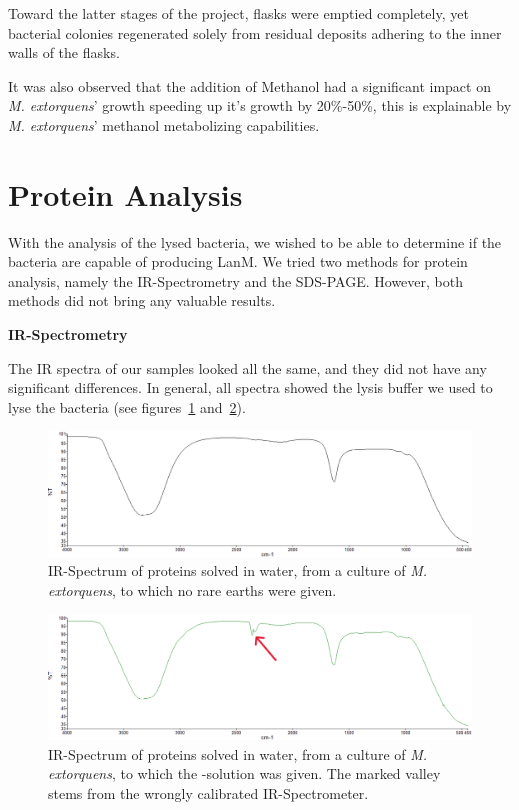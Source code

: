 Toward the latter stages of the project, flasks were emptied completely, yet bacterial colonies
regenerated solely from residual deposits adhering to the inner walls of the flasks.

It was also observed that the addition of Methanol had a significant impact on \emph{M. extorquens}’
growth speeding up it’s growth by 20\%-50\%, this is explainable by \emph{M. extorquens}’ methanol
metabolizing capabilities.

\section{Protein Analysis\authorA}

With the analysis of the lysed bacteria, we wished to be able to determine if the bacteria are capable of producing LanM.
We tried two methods for protein analysis, namely the IR-Spectrometry and the SDS-PAGE.
However, both methods did not bring any valuable results.

\textbf{IR-Spectrometry}

The IR spectra of our samples looked all the same, and they did not have any significant differences.
In general, all spectra showed the lysis buffer we used to lyse the bacteria (see figures~\ref{fig:ir_spectrum_2} and~\ref{fig:ir_spectrum_1}).

\begin{figure}[H]
    \centering
    \includegraphics[width=1\textwidth]{./media/images/ir_spectrum_2}
    \caption{IR-Spectrum of proteins solved in water, from a culture of \emph{M. extorquens}, to which no rare earths were given. }
    \label{fig:ir_spectrum_2}
\end{figure}

\begin{figure}[H]
    \centering
    \includegraphics[width=1\textwidth]{./media/images/ir_spectrum_1}
    \caption{IR-Spectrum of proteins solved in water, from a culture of \emph{M. extorquens}, to which the -solution was given. The marked valley stems from the wrongly calibrated IR-Spectrometer. }
    \label{fig:ir_spectrum_1}
\end{figure}

